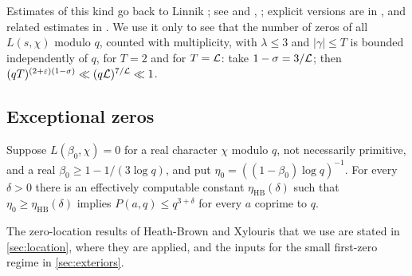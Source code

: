 Estimates of this kind go back to Linnik \cite{Linnik1944least,Linnik1944deuring}; see
\cite{Turan1961density,Fogels1965zeros,Gallagher1970large,Montgomery1971topics,Jutila1977linnik,
Motohashi1975density,Bombieri1987grand} and \cite[(1.4)]{HeathBrown1992zero},
\cite[Prinzip~3, p.~11]{Xylouris2011nullstellen}; explicit versions are in
\cite{ThornerZaman2024explicit}, and related estimates in
\cite{Ingham1940estimation,Huxley1972difference,Jutila1972density,HeathBrown1979density,
SoundararajanThorner2019weak,Pintz2019some}. We use it only to see that the number of zeros of all
$L(s,\chi)$ modulo $q$, counted with multiplicity, with $\lambda\le3$ and $|\gamma|\le T$ is bounded
independently of $q$, for $T=2$ and for $T=\mathcal{L}$: take $1-\sigma=3/\mathcal{L}$; then
$(qT)^{(2+\varepsilon)(1-\sigma)}\ll(q\mathcal{L})^{7/\mathcal{L}}\ll1$.

\subsection{Exceptional zeros}

\begin{inp}\label{inp:siegel}
Suppose $L(\beta_0,\chi)=0$ for a real character $\chi$ modulo $q$, not necessarily primitive,
and a real $\beta_0\ge1-1/(3\log q)$, and put $\eta_0=((1-\beta_0)\log q)^{-1}$. For every $\delta>0$
there is an effectively computable constant $\eta_{\mathrm{HB}}(\delta)$ such that $\eta_0\ge\eta_{\mathrm{HB}}(\delta)$
implies $P(a,q)\le q^{3+\delta}$ for every $a$ coprime to $q$.
\end{inp}

The zero-location results of Heath-Brown and Xylouris that we use are stated in
\cref{sec:location}, where they are applied, and the inputs for the small first-zero regime in
\cref{sec:exteriors}.
